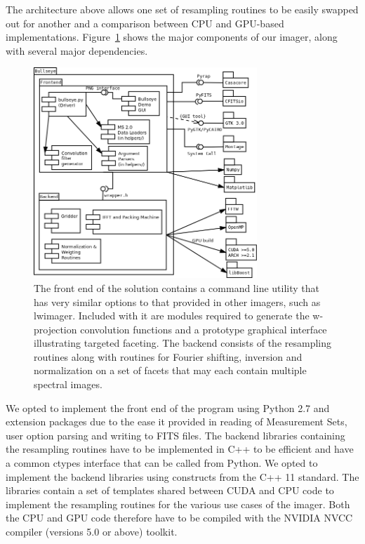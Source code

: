 The architecture above allows one set of resampling routines to be easily swapped out for another and a comparison between CPU and GPU-based implementations. Figure~\ref{fig_arch} shows
the major components of our imager, along with several major dependencies.
\begin{figure}[h]
  \begin{mdframed}
    \centering
      \includegraphics[width=0.75\textwidth]{images/bullseye_arch.png}
      \caption{}
    \caption[Bullseye Architecture]{The front end of the solution contains a command line utility that has very similar options to that provided in other imagers, such as lwimager.
    Included with it are modules required to generate the w-projection convolution functions and a prototype graphical interface illustrating targeted faceting. The backend consists
    of the resampling routines along with routines for Fourier shifting, inversion and normalization on a set of facets that may each contain multiple spectral images.}
    \label{fig_arch}
  \end{mdframed}
\end{figure}

We opted to implement the front end of the program using Python 2.7 and extension packages due to the ease it provided in reading of Measurement Sets, user option 
parsing and writing to FITS files. The backend libraries containing the resampling routines have to be implemented in C++ to be efficient and have a common ctypes interface 
that can be called from Python. We opted to implement the backend libraries using constructs from the C++ 11 standard. The libraries contain a set of
templates shared between CUDA and CPU code to implement the resampling routines for the various use cases of the imager. Both the CPU and GPU code therefore
have to be compiled with the NVIDIA NVCC compiler (versions 5.0 or above) toolkit.

